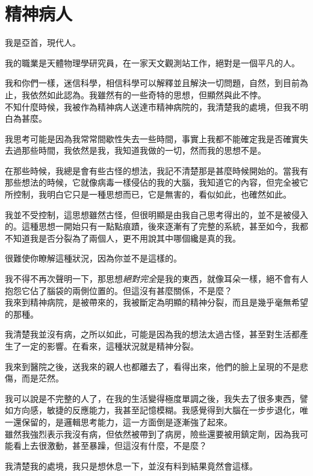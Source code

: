 \chapter{精神病人}
我是亞首，現代人。

我的職業是天體物理學研究員，在一家天文觀測站工作，絕對是一個平凡的人。

我和你們一樣，迷信科學，相信科學可以解釋並且解決一切問題，自然，到目前為止，我依然如此認為。我雖然有的一些奇特的思想，但顯然與此不悖。
\\


不知什麼時候，我被作為精神病人送達市精神病院的，我清楚我的處境，但我不明白為甚麼。

我思考可能是因為我常常間歇性失去一些時間，事實上我都不能確定我是否確實失去過那些時間，我依然是我，我知道我做的一切，然而我的思想不是。

在那些時候，我總是會有些古怪的想法，我記不清楚那是甚麼時候開始的。當我有那些想法的時候，它就像病毒一樣侵佔的我的大腦，我知道它的內容，但完全被它所控制，我明白它只是一種思想而已，它是無害的，看似如此，也確然如此。

我並不受控制，這思想雖然古怪，但很明顯是由我自己思考得出的，並不是被侵入的。這種思想一開始只有一點點痕蹟，後來逐漸有了完整的系統，甚至如今，我都不知道我是否分裂為了兩個人，更不用說其中哪個纔是真的我。

很難使你瞭解這種狀況，因為你並不是這樣的。

我不得不再次聲明一下，那思想\emph{絕對完全}是我的東西，就像耳朵一樣，絕不會有人抱怨它佔了腦袋的兩側位置的。但這沒有甚麼關係，不是麼？
\\


我來到精神病院，是被帶來的，我被斷定為明顯的精神分裂，而且是幾乎毫無希望的那種。

我清楚我並沒有病，之所以如此，可能是因為我的想法太過古怪，甚至對生活都產生了一定的影響。在看來，這種狀況就是精神分裂。

我來到醫院之後，送我來的親人也都離去了，看得出來，他們的臉上呈現的不是悲傷，而是茫然。

我可以說是不完整的人了，在我的生活變得極度單調之後，我失去了很多東西，譬如方向感，敏捷的反應能力，我甚至記憶模糊。我感覺得到大腦在一步步退化，唯一還保留的，是邏輯思考能力，這一方面倒是逐漸強了起來。
\\


雖然我強烈表示我沒有病，但依然被帶到了病房，險些還要被用鎮定劑，因為我可能看上去很激動，甚至暴躁，但這沒有什麼，不是麼？

我清楚我的處境，我只是想休息一下，並沒有料到結果竟然會這樣。

